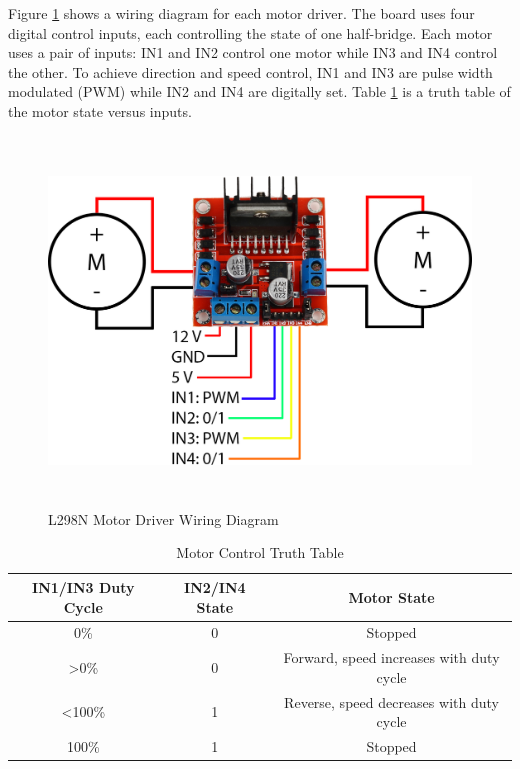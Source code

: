 Figure \ref{fig:l298n} shows a wiring diagram for each motor driver. The board uses four digital control inputs, each controlling the state of one half-bridge. Each motor uses a pair of inputs: IN1 and IN2 control one motor while IN3 and IN4 control the other. To achieve direction and speed control, IN1 and IN3 are pulse width modulated (PWM) while IN2 and IN4 are digitally set. Table \ref{tab:L298N_truth_table} is a truth table of the motor state versus inputs.

\begin{figure}[H]   %
	\centering \includegraphics[width=6in, height=3.85in, keepaspectratio]{figures/l298n.png}
	\caption{L298N Motor Driver Wiring Diagram \cite{l298n}}\label{fig:l298n}
\end{figure}

\begin{table}[h]
	\centering	\caption{Motor Control Truth Table}
	\begin{tabular}{ccc}
		\hline 
		IN1/IN3 Duty Cycle & IN2/IN4 State & Motor State \\ 
		\hline 
		0\% & 0 & Stopped \\ 
		\hline 
		\textgreater 0\% & 0 & Forward, speed increases with duty cycle \\ 
		\hline 
		\textless 100\% & 1 & Reverse, speed decreases with duty cycle \\ 
		\hline 
		100\% & 1 & Stopped \\ 
		\hline 
	\end{tabular} 
	\label{tab:L298N_truth_table}
\end{table}

